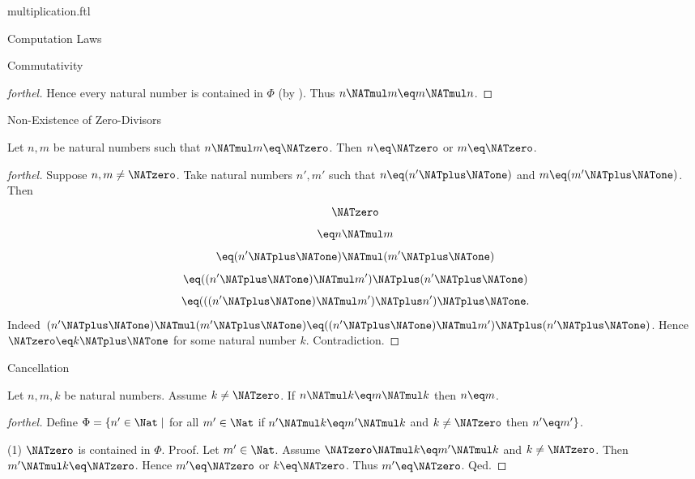 \documentclass{naproche-library}
\begin{document}
\begin{smodule}[title=Multiplication]{multiplication.ftl}
\begin{sfragment}{Computation Laws}
\begin{sfragment}{Commutativity}
\begin{proof}[forthel]
      Hence every natural number is contained in $\Phi$ (by ).
      Thus $n \NATmul m \eq m \NATmul n$.
    \end{proof}
  \end{sfragment}

  \begin{sfragment}{Non-Existence of Zero-Divisors}
    \begin{proposition}[forthel,id=ARITHMETIC_06_3843962875936768]
      Let $n, m$ be natural numbers such that $n \NATmul m \eq \NATzero$.
      Then $n \eq \NATzero$ or $m \eq \NATzero$.
    \end{proposition}
    \begin{proof}[forthel]
      Suppose $n, m \neq \NATzero$.
      Take natural numbers $n', m'$ such that $n \eq (n' \NATplus \NATone)$ and $m \eq (m' \NATplus \NATone)$.
      Then
      \[  \NATzero                                     \]
      \[    \eq n \NATmul m                         \]
      \[    \eq (n' \NATplus \NATone) \NATmul (m' \NATplus \NATone)           \]
      \[    \eq ((n' \NATplus \NATone) \NATmul m') \NATplus (n' \NATplus \NATone)    \]
      \[    \eq (((n' \NATplus \NATone) \NATmul m') \NATplus n') \NATplus \NATone.   \]
      Indeed $(n' \NATplus \NATone) \NATmul (m' \NATplus \NATone) \eq ((n' \NATplus \NATone) \NATmul m') \NATplus (n' \NATplus \NATone)$.
      Hence $\NATzero \eq k \NATplus \NATone$ for some natural number $k$.
      Contradiction.
    \end{proof}
  \end{sfragment}

  \begin{sfragment}{Cancellation}
    \begin{proposition}[forthel,id=ARITHMETIC_06_31055184658432]
      Let $n, m, k$ be natural numbers.
      Assume $k \neq \NATzero$.
      If $n \NATmul k \eq m \NATmul k$ then $n \eq m$.
    \end{proposition}
    \begin{proof}[forthel]
      Define $\Phi = \{ n' \in \Nat \mid$ for all $m' \in \Nat$ if $n' \NATmul k \eq m' \NATmul k$ and $k \neq \NATzero$ then $n' \eq m' \}$.

      (1) $\NATzero$ is contained in $\Phi$. \newline
      Proof.
        Let $m' \in \Nat$.
        Assume $\NATzero \NATmul k \eq m' \NATmul k$ and $k \neq \NATzero$.
        Then $m' \NATmul k \eq \NATzero$.
        Hence $m' \eq \NATzero$ or $k \eq \NATzero$.
        Thus $m' \eq \NATzero$.
      Qed.


\end{proof}
\end{sfragment}
\end{sfragment}
\end{smodule}
\end{document}
